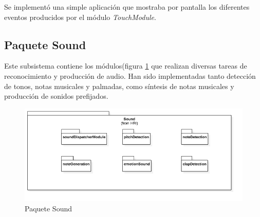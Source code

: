 Se implementó una simple aplicación que mostraba por pantalla los diferentes eventos producidos por el módulo \textit{TouchModule}.


\newpage

\subsection{Paquete Sound}
Este subsistema contiene los módulos(figura \ref{fig:sound-package} que realizan diversas tareas de reconocimiento y producción de audio.  Han sido implementadas tanto detección de tonos, notas musicales y palmadas, como síntesis de notas musicales y producción de sonidos prefijados.
\begin{figure}
	\centering
	\includegraphics[width=1\linewidth]{imagenes/diagramas/Sound.png}
	\caption{Paquete Sound}
	\label{fig:sound-package}
\end{figure}
